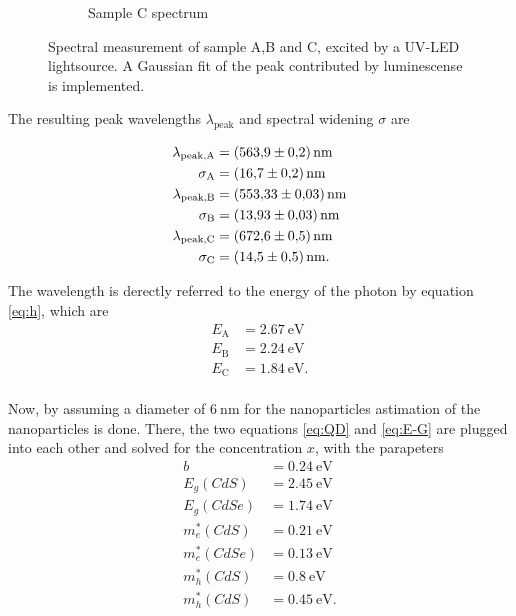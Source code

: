 \begin{figure}
\begin{subfigure}{.3\textwidth}
  \caption{Sample C spectrum}
    \label{fig:Samp_C_D}
\end{subfigure}
\caption{Spectral measurement of sample A,B and C, excited by a UV-LED lightsource. A Gaussian fit of the peak contributed by luminescense is implemented.}
\end{figure}

The resulting peak wavelengths $\lambda_\text{peak}$ and spectral widening $\sigma$ are

\begin{align*}
    \lambda_\text{peak,A} &= \SI{563.9 \pm 0.2}{\nano\meter} \\
    \sigma_\text{A} &= \SI{16.7 \pm 0.2}{\nano\meter} \\
    \lambda_\text{peak,B} &= \SI{553.33 \pm 0.03}{\nano\meter} \\
    \sigma_\text{B} &= \SI{13.93 \pm 0.03}{\nano\meter} \\
    \lambda_\text{peak,C} &= \SI{672.6 \pm 0.5}{\nano\meter} \\
    \sigma_\text{C} &= \SI{14.5 \pm 0.5}{\nano\meter}. \\
\end{align*}

The wavelength is derectly referred to the energy of the photon by equation \ref{eq:h}, which are 
\begin{align*}
    E_\text{A} &= \SI{2.67}{\eV} \\
    E_\text{B} &= \SI{2.24}{\eV} \\
    E_\text{C} &= \SI{1.84}{\eV}. \\
\end{align*}

Now, by assuming a diameter of $\SI{6}{\nano\meter}$ for the nanoparticles astimation of the nanoparticles is done.
There, the two equations \ref{eq:QD} and \ref{eq:E-G} are plugged into each other and solved for the concentration $x$, with the parapeters
\begin{align*}
    b          &= \SI{0.24}{\eV}\\
    E_g(CdS)   &= \SI{2.45}{\eV}\\
    E_g(CdSe)  &= \SI{1.74}{\eV}\\
    m^*_e(CdS) &= \SI{0.21}{\eV}\\
    m^*_e(CdSe)&= \SI{0.13}{\eV}\\
    m^*_h(CdS) &= \SI{0.8}{\eV}\\
    m^*_h(CdS) &= \SI{0.45}{\eV}.\\
\end{align*}\cite{instruction}

